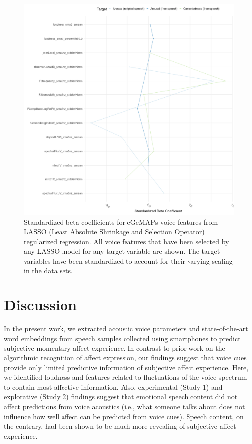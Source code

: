 \documentclass[
  english,
  man,floatsintext]{apa6}
\begin{document}
\begin{figure}

{\centering \includegraphics[width=1\linewidth,height=1\textheight]{../figures/betas_plot} 

}

\caption[LASSO betas]{Standardized beta coefficients for eGeMAPs voice features from LASSO (Least Absolute Shrinkage and Selection Operator) regularized regression. All voice features that have been selected by any LASSO model for any target variable are shown. The target variables have been standardized to account for their varying scaling in the data sets.}\label{fig:lassobetas}
\end{figure}
\newpage

\hypertarget{discussion}{%
\section{Discussion}\label{discussion}}

In the present work, we extracted acoustic voice parameters and state-of-the-art word embeddings from speech samples collected using smartphones to predict subjective momentary affect experience. In contrast to prior work on the algorithmic recognition of affect expression, our findings suggest that voice cues provide only limited predictive information of subjective affect experience. Here, we identified loudness and features related to fluctuations of the voice spectrum to contain most affective information. Also, experimental (Study 1) and explorative (Study 2) findings suggest that emotional speech content did not affect predictions from voice acoustics (i.e., what someone talks about does not influence how well affect can be predicted from voice cues). Speech content, on the contrary, had been shown to be much more revealing of subjective affect experience.
\end{document}
